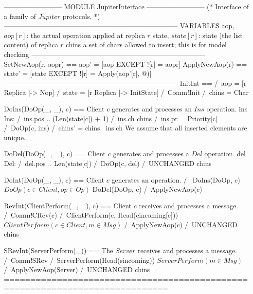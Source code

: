 \documentclass{article}
\begin{document}
\begin{tla}
-------------------------- MODULE JupiterInterface --------------------------
(*
Interface of a family of $Jupiter$ protocols.
*)
-----------------------------------------------------------------------------
VARIABLES aop,    \* $aop[r]$: the actual operation applied at replica $r$
          state,  \* $state[r]$: state (the list content) of replica $r$ 
          chins   \* a set of chars allowed to insert; this is for model checking
-----------------------------------------------------------------------------
SetNewAop(r, aopr) == aop' = [aop EXCEPT ![r] = aopr]
ApplyNewAop(r) == state' = [state EXCEPT ![r] = Apply(aop'[r], @)]
-----------------------------------------------------------------------------
InitInt ==
    /\ aop = [r \in Replica |-> Nop]
    /\ state = [r \in Replica |-> InitState]
    /\ Comm!Init
    /\ chins = Char
    
DoIns(DoOp(_, _), c) == \* Client $c$ generates and processes an $Ins$ operation.
    \E ins \in Ins: 
        /\ ins.pos  .. (Len(state[c]) + 1) 
        /\ ins.ch \in chins 
        /\ ins.pr = Priority[c]
        /\ DoOp(c, ins)
        /\ chins' = chins \ {ins.ch} \* We assume that all inserted elements are unique.

DoDel(DoOp(_, _), c) == \* Client $c$ generates and processes a $Del$ operation.
    \E del \in Del: 
        /\ del.pos  .. Len(state[c])
        /\ DoOp(c, del)
        /\ UNCHANGED chins

DoInt(DoOp(_, _), c) == \* Client $c$ generates an operation.
    /\ \/ DoIns(DoOp, c)\* $DoOp(c \in Client, op \in Op)$
       \/ DoDel(DoOp, c)
    /\ ApplyNewAop(c)
    
RevInt(ClientPerform(_, _), c) == \* Client $c$ receives and processes a message.
    /\ Comm!CRev(c)
    /\ ClientPerform(c, Head(cincoming[c])) \* $ClientPerform(c \in Client, m \in Msg)$
    /\ ApplyNewAop(c)
    /\ UNCHANGED chins

SRevInt(ServerPerform(_)) == \* The $Server$ receives and processes a message.
    /\ Comm!SRev
    /\ ServerPerform(Head(sincoming)) \* $ServerPerform(m \in Msg)$
    /\ ApplyNewAop(Server)
    /\ UNCHANGED chins
=============================================================================
\end{tla}
\end{document}
